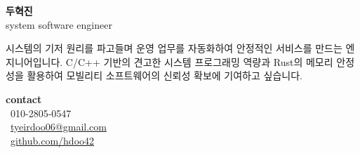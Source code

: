 \documentclass[10pt, a4paper]{article}
\newcommand{\descstyle}{\lightfont\fontsize{9.5pt}{10pt}\selectfont}
\begin{document}
\pagestyle{empty}

\noindent
\begin{minipage}[t]{0.61 \textwidth} 
    {\huge\bfseries 두혁진} \\[0.5em]
    {\Large\textcolor{bonusSteelBlue}{system software engineer}} 
    \vspace{0.8em}
    
    {\descstyle 
    시스템의 기저 원리를 파고들며 운영 업무를 자동화하여 안정적인 서비스를 만드는 엔지니어입니다.
    C/C++ 기반의 견고한 시스템 프로그래밍 역량과 Rust의 메모리 안정성을 활용하여 
    모빌리티 소프트웨어의 신뢰성 확보에 기여하고 싶습니다.}
\end{minipage}%
\hfill
\begin{minipage}[t]{0.28\textwidth} 
    {\huge\bfseries contact} \\
    {\descstyle
    \faPhone \ 010-2805-0547 \\
    \faEnvelope \ \href{mailto:tyeirdoo06@gmail.com}{tyeirdoo06@gmail.com} \\
    \faGithub \ \href{https://github.com/hdoo42}{github.com/hdoo42}
    }
\end{minipage}

\vspace{1.5em}
\end{document}
